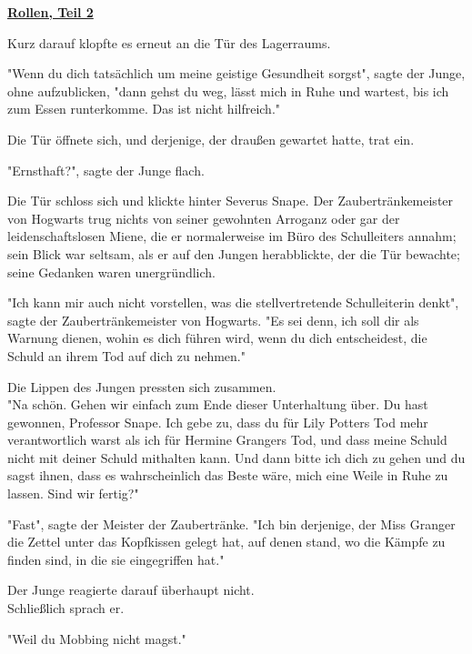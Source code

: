 

\hypertarget{rollen-teil-2}{%

\textbf{\uline{Rollen, Teil 2}}

Kurz darauf klopfte es erneut an die Tür des Lagerraums.

"Wenn du dich tatsächlich um meine geistige Gesundheit sorgst", sagte der Junge, ohne aufzublicken, "dann gehst du weg, lässt mich in Ruhe und wartest, bis ich zum Essen runterkomme. Das ist nicht hilfreich."

Die Tür öffnete sich, und derjenige, der draußen gewartet hatte, trat ein.

"Ernsthaft?", sagte der Junge flach.

Die Tür schloss sich und klickte hinter Severus Snape. Der Zaubertränkemeister von Hogwarts trug nichts von seiner gewohnten Arroganz oder gar der leidenschaftslosen Miene, die er normalerweise im Büro des Schulleiters annahm; sein Blick war seltsam, als er auf den Jungen herabblickte, der die Tür bewachte; seine Gedanken waren unergründlich.

"Ich kann mir auch nicht vorstellen, was die stellvertretende Schulleiterin denkt", sagte der Zaubertränkemeister von Hogwarts. "Es sei denn, ich soll dir als Warnung dienen, wohin es dich führen wird, wenn du dich entscheidest, die Schuld an ihrem Tod auf dich zu nehmen."

Die Lippen des Jungen pressten sich zusammen.\\ "Na schön. Gehen wir einfach zum Ende dieser Unterhaltung über. Du hast gewonnen, Professor Snape. Ich gebe zu, dass du für Lily Potters Tod mehr verantwortlich warst als ich für Hermine Grangers Tod, und dass meine Schuld nicht mit deiner Schuld mithalten kann. Und dann bitte ich dich zu gehen und du sagst ihnen, dass es wahrscheinlich das Beste wäre, mich eine Weile in Ruhe zu lassen. Sind wir fertig?"

"Fast", sagte der Meister der Zaubertränke. "Ich bin derjenige, der Miss Granger die Zettel unter das Kopfkissen gelegt hat, auf denen stand, wo die Kämpfe zu finden sind, in die sie eingegriffen hat."

Der Junge reagierte darauf überhaupt nicht.\\ Schließlich sprach er.

"Weil du Mobbing nicht magst."

}
